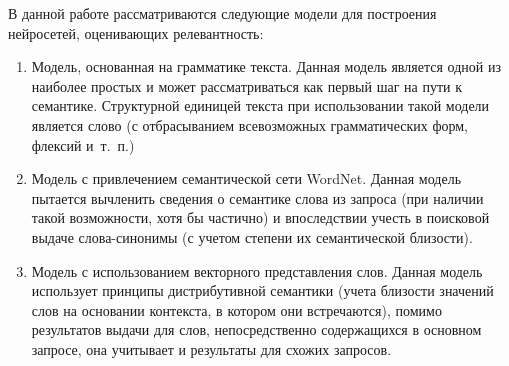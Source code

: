 В данной работе рассматриваются следующие модели для построения нейросетей, оценивающих релевантность:
\begin{enumerate}[1)]
    \item Модель, основанная на грамматике текста. Данная модель является одной из наиболее простых и может
          рассматриваться как первый шаг на пути к семантике. Структурной единицей текста при использовании такой модели
          является слово (с отбрасыванием всевозможных грамматических форм, флексий и~т.~п.)
    \item Модель с привлечением семантической сети WordNet. Данная модель пытается вычленить сведения о
          семантике слова из запроса (при наличии такой возможности, хотя бы частично) и впоследствии учесть
          в поисковой выдаче слова-синонимы (с учетом степени их семантической близости).
    \item Модель с использованием векторного представления слов. Данная модель использует принципы дистрибутивной
          семантики (учета близости значений слов на основании контекста, в котором они встречаются), помимо результатов
          выдачи для слов, непосредственно содержащихся в основном запросе, она учитывает и результаты для схожих
          запросов.
\end{enumerate}